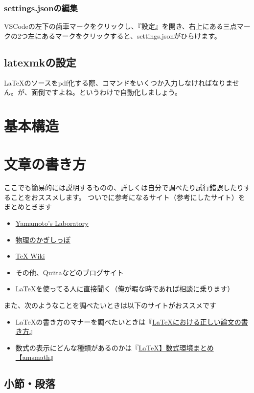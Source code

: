 \documentclass[uplatex,dvipdfmx]{jsarticle}
\numberwithin{equation}{section}
\begin{document}
\subsubsection{settings.jsonの編集}
VSCodeの左下の歯車マークをクリックし、『設定』を開き、右上にある三点マークの2つ左にあるマークをクリックすると、settings.jsonがひらけます。
\subsection*{latexmkの設定}
\LaTeX のソースをpdf化する際、コマンドをいくつか入力しなければなりません。が、面倒ですよね。というわけで自動化しましょう。

\section{基本構造}
\section{文章の書き方}
ここでも簡易的には説明するものの、詳しくは自分で調べたり試行錯誤したりすることをおススメします。
ついでに参考になるサイト（参考にしたサイト）をまとめときます
\begin{itemize}
  \item \href{http://www.yamamo10.jp/yamamoto/comp/latex/make_doc/cover/index.php}{Yamamoto's Laboratory}
  \item \href{http://hooktail.org/computer/index.php?TeX}{物理のかぎしっぽ}
  \item \href{https://texwiki.texjp.org/}{TeX Wiki}
  \item その他、Quiitaなどのブログサイト
  \item \LaTeX を使ってる人に直接聞く（俺が暇な時であれば相談に乗ります）
\end{itemize}
また、次のようなことを調べたいときは以下のサイトがおススメです
\begin{itemize}
  \item \LaTeX の書き方のマナーを調べたいときは『\href{https://qiita.com/birdwatcher/items/5ec42b35d84d3ee2ffbb}{LaTeXにおける正しい論文の書き方}』
  \item 数式の表示にどんな種類があるのかは『\href{https://mathlandscape.com/latex-eq/#toc2}{LaTeX】数式環境まとめ【amsmath}』
\end{itemize}


\subsection*{小節・段落}
\end{document}

